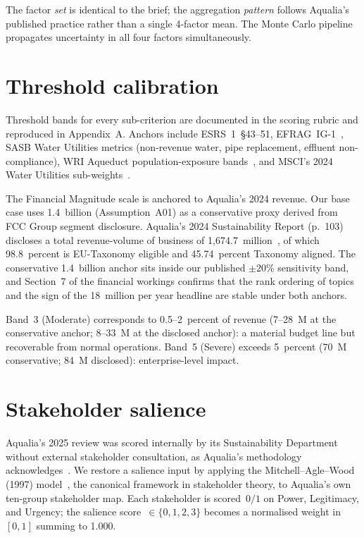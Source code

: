 \documentclass[11pt, a4paper, twoside, openright]{scrreprt}
\newcommand{\euro}{\texteuro}
\begin{document}
The factor \emph{set} is identical to the brief; the aggregation \emph{pattern} follows Aqualia's published practice rather than a single 4-factor mean. The Monte Carlo pipeline propagates uncertainty in all four factors simultaneously.

\section{Threshold calibration}
\label{sec:thresholds}

Threshold bands for every sub-criterion are documented in the scoring rubric and reproduced in Appendix~A. Anchors include ESRS~1~\S 43--51, EFRAG~IG-1~\cite{efrag2024}, SASB Water Utilities metrics \cite{sasb2024} (non-revenue water, pipe replacement, effluent non-compliance), WRI Aqueduct population-exposure bands~\cite{aqueduct2023}, and MSCI's 2024 Water Utilities sub-weights~\cite{msci2024}.

The Financial Magnitude scale is anchored to Aqualia's 2024 revenue. Our base case uses \euro{}1.4~billion (Assumption~A01) as a conservative proxy derived from FCC Group segment disclosure. Aqualia's 2024 Sustainability Report (p.~103) discloses a total revenue-volume of business of \euro{}1{,}674.7~million~\cite{aqualiaSR2024}, of which 98.8~percent is EU-Taxonomy eligible and 45.74~percent Taxonomy aligned. The conservative \euro{}1.4~billion anchor sits inside our published $\pm 20\%$ sensitivity band, and Section~7 of the financial workings confirms that the rank ordering of topics and the sign of the \euro{}18~million per year headline are stable under both anchors.

Band~3 (Moderate) corresponds to 0.5--2~percent of revenue (\euro{}7--28~M at the conservative anchor; \euro{}8--33~M at the disclosed anchor): a material budget line but recoverable from normal operations. Band~5 (Severe) exceeds 5~percent (\euro{}70~M conservative; \euro{}84~M disclosed): enterprise-level impact.

\section{Stakeholder salience}
\label{sec:salience}

Aqualia's 2025 review was scored internally by its Sustainability Department without external stakeholder consultation, as Aqualia's methodology acknowledges~\cite{aqualiaMethodology2025}. We restore a salience input by applying the Mitchell--Agle--Wood (1997) model~\cite{mitchell1997}, the canonical framework in stakeholder theory, to Aqualia's own ten-group stakeholder map. Each stakeholder is scored~$0/1$ on Power, Legitimacy, and Urgency; the salience score~$\in \{0,1,2,3\}$ becomes a normalised weight in $[0, 1]$ summing to 1.000.
\end{document}
